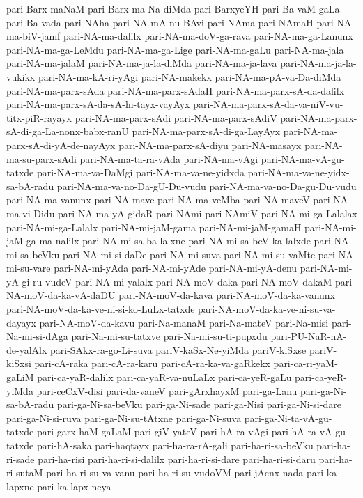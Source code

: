 {pari-Barx-maNaM
pari-Barx-ma-Na-diMda
pari-BarxyeYH
pari-Ba-vaM-gaLa
pari-Ba-vada
pari-NAha
pari-NA-mA-nu-BAvi
pari-NAma
pari-NAmaH
pari-NA-ma-biV-jamf
pari-NA-ma-dalilx
pari-NA-ma-doV-ga-rava
pari-NA-ma-ga-Lanunx
pari-NA-ma-ga-LeMdu
pari-NA-ma-ga-Lige
pari-NA-ma-gaLu
pari-NA-ma-jala
pari-NA-ma-jalaM
pari-NA-ma-ja-la-diMda
pari-NA-ma-ja-lava
pari-NA-ma-ja-la-vukikx
pari-NA-ma-kA-ri-yAgi
pari-NA-makekx
pari-NA-ma-pA-va-Da-diMda
pari-NA-ma-parx-sAda
pari-NA-ma-parx-sAdaH
pari-NA-ma-parx-sA-da-dalilx
pari-NA-ma-parx-sA-da-sA-hi-tayx-vayAyx
pari-NA-ma-parx-sA-da-va-niV-vu-titx-piR-rayayx
pari-NA-ma-parx-sAdi
pari-NA-ma-parx-sAdiV
pari-NA-ma-parx-sA-di-ga-La-nonx-babx-ranU
pari-NA-ma-parx-sA-di-ga-LayAyx
pari-NA-ma-parx-sA-di-yA-de-nayAyx
pari-NA-ma-parx-sA-diyu
pari-NA-masayx
pari-NA-ma-su-parx-sAdi
pari-NA-ma-ta-ra-vAda
pari-NA-ma-vAgi
pari-NA-ma-vA-gu-tatxde
pari-NA-ma-va-DaMgi
pari-NA-ma-va-ne-yidxda
pari-NA-ma-va-ne-yidx-sa-bA-radu
pari-NA-ma-va-no-Da-gU-Du-vudu
pari-NA-ma-va-no-Da-gu-Du-vudu
pari-NA-ma-vanunx
pari-NA-mave
pari-NA-ma-veMba
pari-NA-maveV
pari-NA-ma-vi-Didu
pari-NA-ma-yA-gidaR
pari-NAmi
pari-NAmiV
pari-NA-mi-ga-Lalalax
pari-NA-mi-ga-Lalalx
pari-NA-mi-jaM-gama
pari-NA-mi-jaM-gamaH
pari-NA-mi-jaM-ga-ma-nalilx
pari-NA-mi-sa-ba-lalxne
pari-NA-mi-sa-beV-ka-lalxde
pari-NA-mi-sa-beVku
pari-NA-mi-si-daDe
pari-NA-mi-suva
pari-NA-mi-su-vaMte
pari-NA-mi-su-vare
pari-NA-mi-yAda
pari-NA-mi-yAde
pari-NA-mi-yA-denu
pari-NA-mi-yA-gi-ru-vudeV
pari-NA-mi-yalalx
pari-NA-moV-daka
pari-NA-moV-dakaM
pari-NA-moV-da-ka-vA-daDU
pari-NA-moV-da-kava
pari-NA-moV-da-ka-vanunx
pari-NA-moV-da-ka-ve-ni-si-ko-LuLx-tatxde
pari-NA-moV-da-ka-ve-ni-su-va-dayayx
pari-NA-moV-da-kavu
pari-Na-manaM
pari-Na-mateV
pari-Na-misi
pari-Na-mi-si-dAga
pari-Na-mi-su-tatxve
pari-Na-mi-su-ti-pupxdu
pari-PU-NaR-nA-de-yalAlx
pari-SAkx-ra-go-Li-suva
pariV-kaSx-Ne-yiMda
pariV-kiSxse
pariV-kiSxsi
pari-cA-raka
pari-cA-ra-karu
pari-cA-ra-ka-va-gaRkekx
pari-ca-ri-yaM-gaLiM
pari-ca-yaR-dalilx
pari-ca-yaR-va-nuLaLx
pari-ca-yeR-gaLu
pari-ca-yeR-yiMda
pari-ceCxV-disi
pari-da-vaneV
pari-gArxhayxM
pari-ga-Lanu
pari-ga-Ni-sa-bA-radu
pari-ga-Ni-sa-beVku
pari-ga-Ni-sade
pari-ga-Nisi
pari-ga-Ni-si-dare
pari-ga-Ni-si-ruva
pari-ga-Ni-su-tAtxne
pari-ga-Ni-suva
pari-ga-Ni-ta-vA-gu-tatxde
pari-garx-haM-gaLaM
pari-giV-yateV
pari-hA-ra-vAgi
pari-hA-ra-vA-gu-tatxde
pari-hA-saka
pari-haqtayx
pari-ha-ra-rA-gali
pari-ha-ri-sa-beVku
pari-ha-ri-sade
pari-ha-risi
pari-ha-ri-si-dalilx
pari-ha-ri-si-dare
pari-ha-ri-si-daru
pari-ha-ri-sutaM
pari-ha-ri-su-va-vanu
pari-ha-ri-su-vudoVM
pari-jAcnx-nada
pari-ka-lapxne
pari-ka-lapx-neya
}
